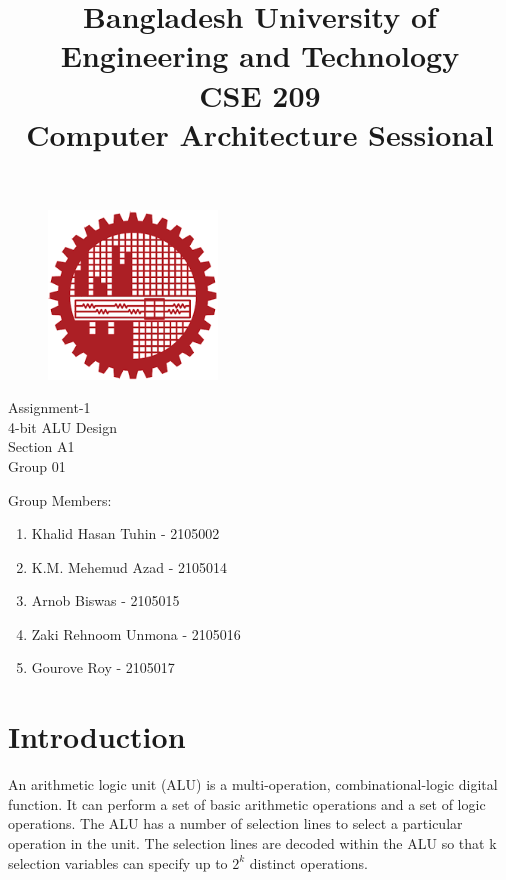 \documentclass[11pt]{article}
\title{Bangladesh University of Engineering and Technology\\
CSE 209\\
Computer Architecture Sessional\\}
\author{}
\date{}
\begin{document}
\maketitle
\begin{figure}[ht]
    \centering
    \includegraphics[width=0.4\textwidth]{images/BUET.png}
\end{figure}
\begin{centering}
    Assignment-1\\
    4-bit ALU Design\\
    \vspace{10mm}
    Section A1\\
    Group 01\\
\end{centering}
\vspace{15mm}
Group Members:
\begin{enumerate}
    \item Khalid Hasan Tuhin - 2105002
    \item K.M. Mehemud Azad - 2105014
    \item Arnob Biswas - 2105015
    \item Zaki Rehnoom Unmona - 2105016
    \item Gourove Roy - 2105017
\end{enumerate}
\pagebreak

\section{Introduction}
An arithmetic logic unit (ALU) is a multi-operation, combinational-logic digital function. It can 
perform a set of basic arithmetic operations and a set of logic operations. The ALU has a number of selection lines to select a particular operation in the unit. The selection lines are decoded 
within the ALU so that k selection variables can specify up to $2^k$
distinct operations.
\end{document}
